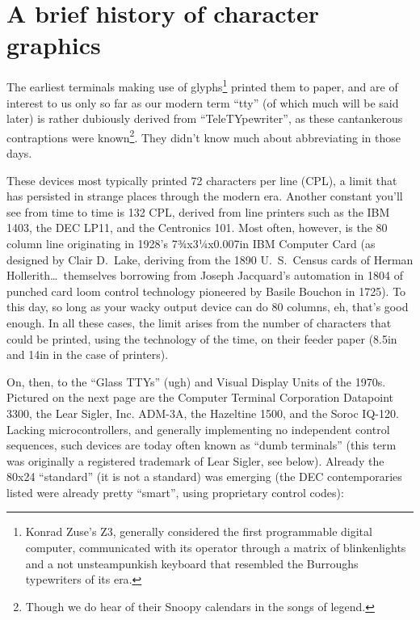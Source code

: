 \documentclass[letterpaper,10pt]{article}
\begin{document}
\newpage

\section{A brief history of character graphics}
The earliest terminals making use of glyphs\footnote{Konrad Zuse's Z3, generally
 considered the first programmable digital computer, communicated with its
operator through a matrix of blinkenlights and a not unsteampunkish keyboard that resembled the
Burroughs typewriters of its era\cite{zuse}.} printed them to paper, and are of
interest to us only so far as our modern term ``tty'' (of which much will be
said later) is rather dubiously derived from ``TeleTYpewriter'', as these
cantankerous contraptions were known\footnote{Though we do hear of their Snoopy
calendars in the songs of legend\cite{quiche}.}. They didn't know much about
abbreviating in those days.

These devices most typically printed 72 characters per line (CPL), a limit that
has persisted in strange places\cite{pandoc} through the modern era. Another constant
you'll see from time to time is 132 CPL, derived from line printers such as the
IBM 1403, the DEC LP11, and the Centronics 101\cite{ibm1403}. Most often,
however, is the 80 column line originating in 1928's 7¾x3¼x0.007in IBM
Computer Card (as designed by Clair D.\ Lake, deriving from the 1890 U.\ S.\
Census cards of Herman Hollerith\ldots\ themselves borrowing from Joseph
Jacquard's automation in 1804 of punched card loom control technology pioneered
by Basile Bouchon in 1725\cite{cards}). To this day, so long as your wacky
output device can do 80 columns, eh, that's good enough. In all these cases,
the limit arises from the number of characters that could be printed, using the
technology of the time, on their feeder paper (8.5in and 14in in the case of
printers).

On, then, to the ``Glass TTYs'' (ugh) and Visual Display Units of the 1970s.
Pictured on the next page are the Computer Terminal Corporation Datapoint 3300, the
Lear Sigler, Inc. ADM-3A, the Hazeltine 1500, and the Soroc IQ-120.
Lacking microcontrollers, and generally implementing no independent control
sequences, such devices are today often known as ``dumb terminals'' (this term
was originally a registered trademark of Lear Sigler, see below). Already the
80x24 ``standard'' (it is not a standard) was emerging (the DEC contemporaries
listed were already pretty ``smart'', using proprietary control codes):
\end{document}
